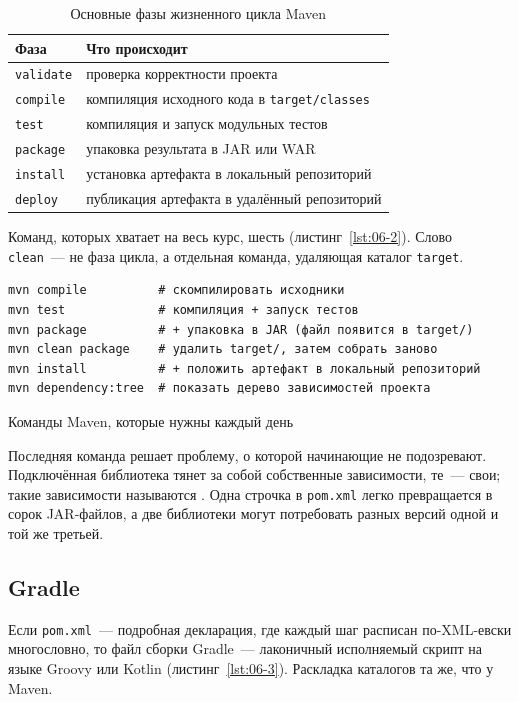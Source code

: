 \begin{table}[htbp]
\caption{Основные фазы жизненного цикла Maven}
\label{tab:06-1}
\centering
\begin{tabular}{L{2.6cm}L{12cm}}
\toprule
Фаза & Что происходит \\
\midrule
\texttt{validate} & проверка корректности проекта \\
\texttt{compile} & компиляция исходного кода в \texttt{target/classes} \\
\texttt{test} & компиляция и запуск модульных тестов \\
\texttt{package} & упаковка результата в JAR или WAR \\
\texttt{install} & установка артефакта в локальный репозиторий \\
\texttt{deploy} & публикация артефакта в удалённый репозиторий \\
\bottomrule
\end{tabular}
\end{table}

Команд, которых хватает на весь курс, шесть (листинг~\ref{lst:06-2}). Слово
\texttt{clean}~--- не фаза цикла, а отдельная команда, удаляющая каталог
\texttt{target}.

\begin{listing}[H]
\begin{verbatim}
mvn compile          # скомпилировать исходники
mvn test             # компиляция + запуск тестов
mvn package          # + упаковка в JAR (файл появится в target/)
mvn clean package    # удалить target/, затем собрать заново
mvn install          # + положить артефакт в локальный репозиторий
mvn dependency:tree  # показать дерево зависимостей проекта
\end{verbatim}
\caption{Команды Maven, которые нужны каждый день}
\label{lst:06-2}
\end{listing}

Последняя команда решает проблему, о которой начинающие не подозревают.
Подключённая библиотека тянет за собой собственные зависимости, те~--- свои;
такие зависимости называются . Одна строчка в
\texttt{pom.xml} легко превращается в сорок JAR-файлов, а две библиотеки могут
потребовать разных версий одной и той же третьей.

\subsection{Gradle}

Если \texttt{pom.xml}~--- подробная декларация, где каждый шаг расписан
по-XML-евски многословно, то файл сборки Gradle~--- лаконичный исполняемый
скрипт на языке Groovy или Kotlin (листинг~\ref{lst:06-3}). Раскладка
каталогов та же, что у Maven.


